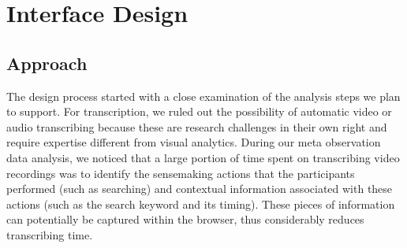 \section{Interface Design}
\label{sec:sp-design}

\subsection{Approach}
The design process started with a close examination of the analysis steps we plan to support. For transcription, we ruled out the possibility of automatic video or audio transcribing because these are research challenges in their own right and require expertise different from visual analytics. During our meta observation data analysis, we noticed that a large portion of time spent on transcribing video recordings was to identify the sensemaking actions that the participants performed (such as searching) and contextual information associated with these actions (such as the search keyword and its timing). These pieces of information can potentially be captured within the browser, thus considerably reduces transcribing time.

